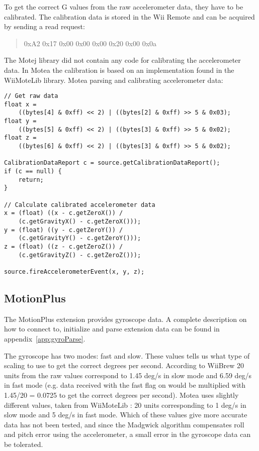 To get the correct G values from the raw accelerometer data, they have to be calibrated. The calibration data is stored in the Wii Remote and can be acquired by sending a read request:
\begin{quote}
0xA2 0x17 0x00 0x00 0x00 0x20 0x00 0x0a
\end{quote}

The Motej \cite{Motej} library did not contain any code for calibrating the accelerometer data. In Motea the calibration is based on an implementation found in the WiiMoteLib \cite{wiiMoteLib} library. Motea parsing and calibrating accelerometer data:
\begin{lstlisting}
// Get raw data
float x = 
	((bytes[4] & 0xff) << 2) | ((bytes[2] & 0xff) >> 5 & 0x03);
float y = 
	((bytes[5] & 0xff) << 2) | ((bytes[3] & 0xff) >> 5 & 0x02);
float z = 
	((bytes[6] & 0xff) << 2) | ((bytes[3] & 0xff) >> 5 & 0x02);

CalibrationDataReport c = source.getCalibrationDataReport();
if (c == null) {
	return;
}

// Calculate calibrated accelerometer data
x = (float) ((x - c.getZeroX()) / 
	(c.getGravityX() - c.getZeroX()));
y = (float) ((y - c.getZeroY()) / 
	(c.getGravityY() - c.getZeroY()));
z = (float) ((z - c.getZeroZ())	/ 
	(c.getGravityZ() - c.getZeroZ()));

source.fireAccelerometerEvent(x, y, z);
\end{lstlisting}

\subsection{MotionPlus}
The MotionPlus extension provides gyroscope data. A complete description on how to connect to, initialize and parse extension data can be found in appendix~\ref{app:gyroParse}.

The gyroscope has two modes: fast and slow. These values tells us what type of scaling to use to get the correct degrees per second. According to WiiBrew \cite{wiiBrew} 20 units from the raw values correspond to 1.45 deg/s in slow mode and 6.59 deg/s in fast mode (e.g. data received with the fast flag on would be multiplied with 1.45/20 = 0.0725 to get the correct degrees per second). Motea uses slightly different values, taken from WiiMoteLib \cite{wiiMoteLib}: 20 units corresponding to 1 deg/s in slow mode and 5 deg/s in fast mode. Which of these values give more accurate data has not been tested, and since the Madgwick algorithm \cite{madgwick} compensates roll and pitch error using the accelerometer, a small error in the gyroscope data can be tolerated.

